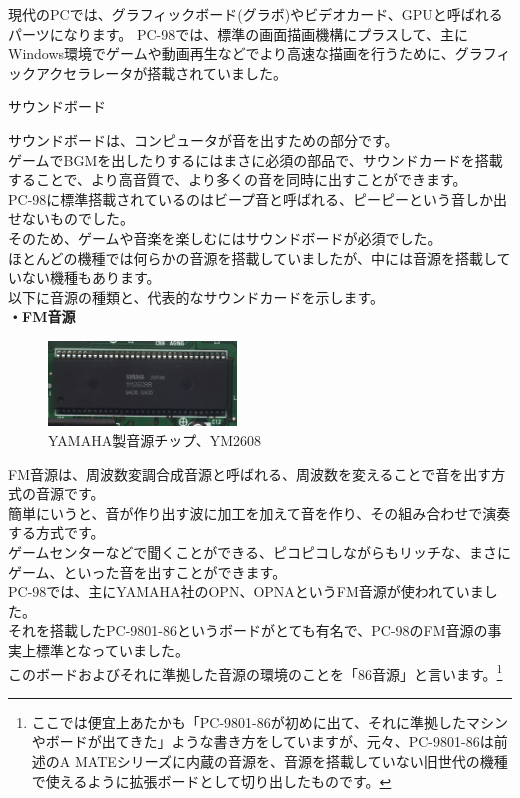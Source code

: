 \documentclass[b5paper,9pt,platex,dvipdfmx]{jsarticle}
\begin{document}
\begin{multicols}{3}
\begin{enumerate}
  現代のPCでは、グラフィックボード(グラボ)やビデオカード、GPUと呼ばれるパーツになります。
  PC-98では、標準の画面描画機構にプラスして、主にWindows環境でゲームや動画再生などでより高速な描画を行うために、グラフィックアクセラレータが搭載されていました。\\
  {\bf  \item サウンドボード\\}
  サウンドボードは、コンピュータが音を出すための部分です。\\
  ゲームでBGMを出したりするにはまさに必須の部品で、サウンドカードを搭載することで、より高音質で、より多くの音を同時に出すことができます。\\
  PC-98に標準搭載されているのはビープ音と呼ばれる、ピーピーという音しか出せないものでした。\\
  そのため、ゲームや音楽を楽しむにはサウンドボードが必須でした。\\
  ほとんどの機種では何らかの音源を搭載していましたが、中には音源を搭載していない機種もあります。\\
  以下に音源の種類と、代表的なサウンドカードを示します。\\
  {\bf ・FM音源 \\}
  \begin{figure}[H]
    \centering
    \includegraphics[width=5cm]{img-4.jpg}
    \caption{YAMAHA製音源チップ、YM2608}
  \end{figure}
  FM音源は、周波数変調合成音源と呼ばれる、周波数を変えることで音を出す方式の音源です。\\
  簡単にいうと、音が作り出す波に加工を加えて音を作り、その組み合わせで演奏する方式です。\\
  ゲームセンターなどで聞くことができる、ピコピコしながらもリッチな、まさにゲーム、といった音を出すことができます。\\
  PC-98では、主にYAMAHA社のOPN、OPNAというFM音源が使われていました。\\
  それを搭載したPC-9801-86というボードがとても有名で、PC-98のFM音源の事実上標準となっていました。\\
  このボードおよびそれに準拠した音源の環境のことを「86音源」と言います。\footnote{ここでは便宜上あたかも「PC-9801-86が初めに出て、それに準拠したマシンやボードが出てきた」ような書き方をしていますが、元々、PC-9801-86は前述のA MATEシリーズに内蔵の音源を、音源を搭載していない旧世代の機種で使えるように拡張ボードとして切り出したものです。}\\

\end{enumerate}
\end{multicols}
\end{document}
